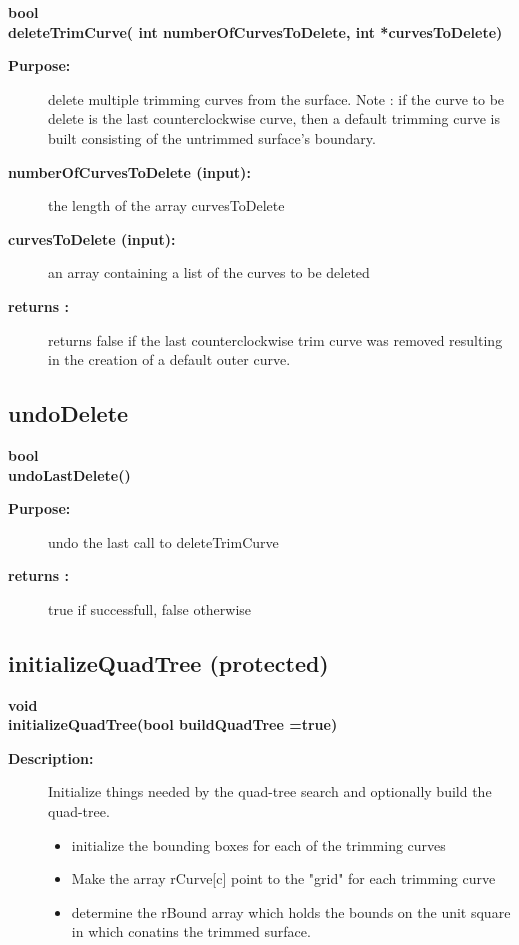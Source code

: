\begin{flushleft} \textbf{%
bool  \\ 
\settowidth{\TrimmedMappingIncludeArgIndent}{deleteTrimCurve(}%
deleteTrimCurve( int numberOfCurvesToDelete, int *curvesToDelete)
}\end{flushleft}
\begin{description}
\item[{\bf Purpose:}]  
    delete multiple trimming curves from the surface. Note : if the curve
 to be delete is the last counterclockwise curve, then a default trimming
 curve is built consisting of the untrimmed surface's boundary.
\item[{\bf numberOfCurvesToDelete (input):}]  the length of the array curvesToDelete
\item[{\bf curvesToDelete (input):}]  an array containing a list of the curves to be deleted
\item[{\bf returns :}]  returns false if the last counterclockwise trim curve was removed 
 resulting in the creation of a default outer curve.
\end{description}
\subsection{undoDelete}
 
\begin{flushleft} \textbf{%
bool  \\ 
\settowidth{\TrimmedMappingIncludeArgIndent}{undoLastDelete(}%
undoLastDelete()
}\end{flushleft}
\begin{description}
\item[{\bf Purpose:}]  undo the last call to deleteTrimCurve
\item[{\bf returns :}]  true if successfull,  false otherwise
\end{description}
\subsection{initializeQuadTree (protected)}
 
\begin{flushleft} \textbf{%
void  \\ 
\settowidth{\TrimmedMappingIncludeArgIndent}{initializeQuadTree(}%
initializeQuadTree(bool buildQuadTree  =true)
}\end{flushleft}
\begin{description}
\item[{\bf Description:}] 
    Initialize things needed by the quad-tree search and optionally build the quad-tree.
  \begin{itemize}
     \item initialize the bounding boxes for each of the trimming curves
     \item Make the array rCurve[c] point to the "grid" for each trimming curve
     \item determine the rBound array which holds the bounds on the unit square
        in which conatins the trimmed surface.
  \end{itemize}
\end{description}
